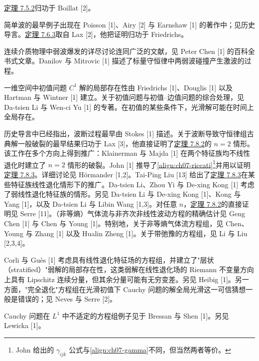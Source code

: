 \documentclass[../../main.tex]{subfiles}
\begin{document}
\hyperref[theorem:ch07-多重特征线性退化]{定理 7.5.2}归功于 Boillat [2]。

简单波的最早例子出现在 Poisson [1]、Airy [2] 与 Earnshaw [1] 的著作中；见历史导言。\hyperref[theorem:ch07-弱前沿后简单波]{定理 7.6.3}取自 Lax [2]，他把证明归功于 Friedrichs。

连续介质物理中弱波爆发的详尽讨论连同广泛的文献，见 Peter Chen [1] 的百科全书式文章。Danilov 与 Mitrovic [1] 描述了标量守恒律中两弱波碰撞产生激波的过程。

一维空间中初值问题 $C^1$ 解的局部存在性由 Friedrichs [1]、Douglis [1] 以及 Hartman 与 Wintner [1] 建立。关于初值问题与初值--边值问题的综合处理，见 Da-tsien Li 与 Wen-ci Yu [1] 的专著。在初值的某些条件下，光滑解可能在时间上全局存在。

历史导言中已经指出，波断过程最早由 Stokes [1] 描述。关于波断导致守恒律组古典解一般破裂的最早结果归功于 Lax [3]，他直接证明了\hyperref[theorem:ch07-Riemann系破裂]{定理 7.8.2}的 $n=2$ 情形。该工作在多个方向上得到推广：Klainerman 与 Majda [1] 在两个特征族均不线性退化时建立了 $n=2$ 情形的破裂。John [1] 推导了\eqref{align:ch07-riccati}\footnote{John 给出的 $\gamma_{ijk}$ 公式与\eqref{align:ch07-gamma}不同，但当然两者等价。}并用以证明\hyperref[theorem:ch07-线性退化全局存在]{定理 7.8.3}。详细讨论见 Hörmander [1,2]。Tai-Ping Liu [13] 给出了\hyperref[theorem:ch07-线性退化全局存在]{定理 7.8.3}在某些特征族线性退化情形下的推广。Da-tsien Li、Zhou Yi 与 De-xing Kong [1] 考虑了弱线性退化特征族的情形。另见 Da-tsien Li 与 De-xing Kong [1]、Kong 与 Yang [1]，以及 Da-tsien Li 与 Libin Wang [1,3]。对任意 $n$，\hyperref[theorem:ch07-Riemann系破裂]{定理 7.8.2}的直接证明见 Serre [11]。（非等熵）气体流与非齐次非线性波动方程的精确估计见 Geng Chen [1] 与 Chen 与 Young [1]。特别地，关于非等熵气体流方程组，见 Chen、Young 与 Zhang [1] 以及 Hualin Zheng [1]。关于带弛豫的方程组，见 Li 与 Liu [2,3,4]。

Corli 与 Guès [1] 考虑具有线性退化特征场的方程组，并建立了"层状（stratified）"弱解的局部存在性，这类弱解在线性退化场的 Riemann 不变量方向上具有 Lipschitz 连续分量，但其余分量可能有无穷变差。另见 Heibig [1]。另一方面，"完全退化"方程组在光滑初值下 Cauchy 问题的解全局光滑这一可信猜想一般是错误的；见 Neves 与 Serre [2]。

Cauchy 问题在 $L^1$ 中不适定的方程组例子见于 Bressan 与 Shen [1]。另见 Lewicka [1]。
\end{document}

